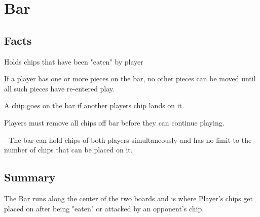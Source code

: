 \section{Bar}

\subsection{Facts}

\begin{dashed}
	\item Holds chips that have been "eaten" by player
	\item If a player has one or more pieces on the bar,
      no other pieces can be moved until all such pieces
      have re-entered play.
  \item A chip goes on the bar if another players chip lands on it.
  \item Players must remove all chips off bar before they can continue playing.
\end{dashed}

\noindent
\newline{} - The bar can hold chips of both players simultaneously
and has no limit to the number of chips that can be placed on it.

\subsection{Summary}
The Bar runs along the center of the two boards and is where Player's chips get placed
on after being "eaten" or attacked by an opponent's chip.
